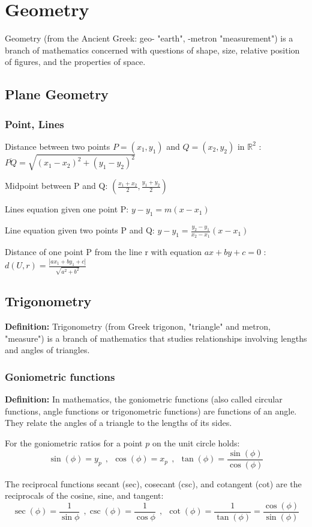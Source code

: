 \chapter{Geometry}
Geometry (from the Ancient Greek: geo- "earth", -metron "measurement") is a branch of mathematics concerned with questions of shape, size, relative position of figures, and the properties of space.


\section{Plane Geometry}
\subsection{Point, Lines}
Distance between two points $P=(x_1,y_1)$ and $Q=(x_2,y_2)$ in $\mathbb{R}^2$ : $ \overline{PQ} = \sqrt{(x_1-x_2)^2+(y_1-y_2)^2} $

Midpoint between P and Q: $\left(\frac{x_1+x_2}{2},\frac{y_1+y_2}{2}\right)$

Lines equation given one point P: $ y-y_1 = m(x-x_1) $

Line equation given two points P and Q: $ y-y_1 = \frac{y_2-y_1}{x_2-x_1}(x-x_1) $

Distance of one point P from the line r with equation $ax+by+c=0$ : $ d(U,r) = \frac{\left|ax_1+by_1+c\right|}{\sqrt{a^2+b^2}}$


\section{Trigonometry}
\textbf{Definition:} Trigonometry (from Greek trigonon, "triangle" and metron, "measure") is a branch of mathematics that studies relationships involving lengths and angles of triangles.

\subsection{Goniometric functions}
\textbf{Definition:} In mathematics, the goniometric functions (also called circular functions, angle functions or trigonometric functions) are functions of an angle. They relate the angles of a triangle to the lengths of its sides. 

For the goniometric ratios for a point $p$ on the unit circle holds:
\[
\sin(\phi)=y_p~~,~~\cos(\phi)=x_p~~,~~\tan(\phi)=\frac{\sin(\phi)}{\cos(\phi)}
\]

The reciprocal functions secant (sec), cosecant (csc), and cotangent (cot) are the reciprocals of the cosine, sine, and tangent:
\[
\sec(\phi)=\frac{1}{\sin{\phi}}~~,\csc(\phi)=\frac{1}{\cos{\phi}}~~,~~\cot(\phi)=\frac{1}{\tan(\phi)}=\frac{\cos(\phi)}{\sin(\phi)}
\]

